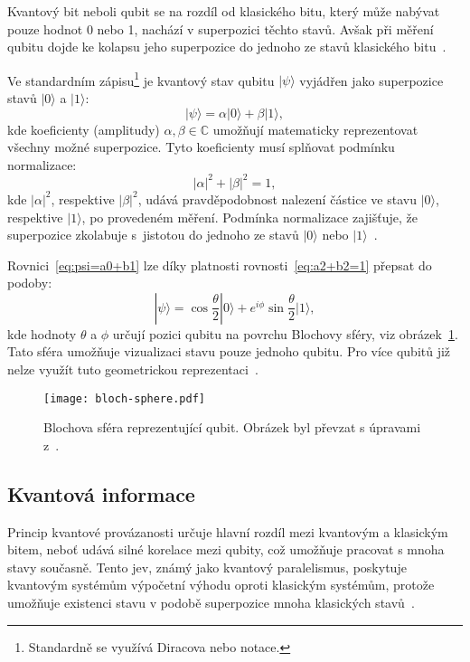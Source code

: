 Kvantový bit neboli qubit se na rozdíl od klasického bitu, který může nabývat pouze hodnot 0 nebo 1, nachází v superpozici těchto stavů. 
Avšak při měření qubitu dojde ke kolapsu jeho superpozice do jednoho ze stavů klasického bitu~\cite{QuantumComputing-Curious}. 

Ve standardním zápisu\footnote{Standardně se využívá Diracova nebo  notace.} je kvantový stav qubitu $| \psi \rangle$ vyjádřen jako superpozice stavů $| 0 \rangle$ a $| 1 \rangle$:
\begin{equation}\label{eq:psi=a0+b1}
    | \psi \rangle = \alpha | 0 \rangle + \beta | 1 \rangle, 
\end{equation}
kde koeficienty (amplitudy) $\alpha, \beta \in \mathbb{C}$ umožňují matematicky reprezentovat všechny možné superpozice. 
Tyto koeficienty musí splňovat podmínku normalizace:
\begin{equation}\label{eq:a2+b2=1}
    \left| \alpha \right|^2 + \left| \beta \right|^2 = 1,   
\end{equation}
kde $\left| \alpha \right|^2$, respektive $\left| \beta \right|^2$, udává pravděpodobnost nalezení částice ve stavu $| 0 \rangle$, respektive $| 1 \rangle$, po provedeném měření. 
Podmínka normalizace zajišťuje, že superpozice zkolabuje s~jistotou do jednoho ze stavů $| 0 \rangle$ nebo $| 1 \rangle$~\cite{NaturalComputing,QuantumComputing-Curious}.

Rovnici~\ref{eq:psi=a0+b1} lze díky platnosti rovnosti~\ref{eq:a2+b2=1} přepsat do podoby:
\begin{equation*}
    | \psi \rangle = \cos{\frac{\theta}{2}} | 0 \rangle +  e^{i\phi} \sin{\frac{\theta}{2}} | 1 \rangle,
\end{equation*}
kde hodnoty $\theta$ a $\phi$ určují pozici qubitu na povrchu Blochovy sféry, viz obrázek~\ref{fig:bloch-sphere}. 
Tato sféra umožňuje vizualizaci stavu pouze jednoho qubitu. 
Pro více qubitů již nelze využít tuto geometrickou reprezentaci~\cite{QuantumComputing-Curious,QuantumComputing-QuantumInformation}. 

\begin{figure}[ht!]
    \centering
    \texttt{[image: bloch-sphere.pdf]}
    \caption{Blochova sféra reprezentující qubit. Obrázek byl převzat s úpravami z~\cite{QuantumComputing-QuantumInformation}.}
    \label{fig:bloch-sphere}
\end{figure}

\subsection{Kvantová informace}
Princip kvantové provázanosti určuje hlavní rozdíl mezi kvantovým a klasickým bitem, neboť udává silné korelace mezi qubity, což umožňuje pracovat s mnoha stavy současně. 
Tento jev, známý jako kvantový paralelismus, poskytuje kvantovým systémům výpočetní výhodu oproti klasickým systémům, protože umožňuje existenci stavu v podobě superpozice mnoha klasických stavů~\cite{NaturalComputing}.

